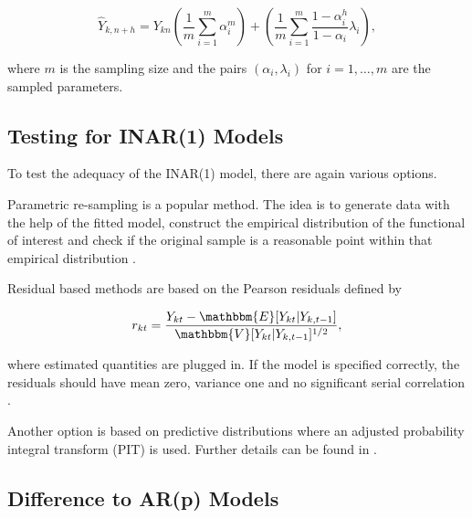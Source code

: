 \begin{equation}
\hat{Y}_{k,n+h}= Y_{kn}\left(\frac{1}{m} \sum_{i=1}^m\alpha_i^m\right) + \left(\frac{1}{m} \sum_{i=1}^m \frac{1-\alpha_i^h}{1-\alpha_i}\lambda_i\right),
\label{eq:Forecasting Bayesian}
\end{equation}

where $m$ is the sampling size and the pairs $(\alpha_i,\lambda_i)$ for $i=1,\ldots,m$ are the sampled parameters. 

\subsection{Testing for INAR(1) Models}
\label{sec:Testing for INAR(1) Models}

To test the adequacy of the INAR(1) model, there are again various options. 

Parametric re-sampling is a popular method. The idea is to generate data with the help of the fitted model, construct the empirical distribution of the functional of interest and check if the original sample is a reasonable point within that empirical distribution \cite{Silva:2005}. 

Residual based methods are based on the Pearson residuals defined by 

\begin{equation}
r_{kt} = \frac{Y_{kt}-\mathbbm{E}[Y_{kt}|Y_{k,t-1}]}{\mathbbm{V}[Y_{kt}|Y_{k,t-1}]^{1/2}},
\label{eq:Pearson residuals}
\end{equation}

where estimated quantities are plugged in. If the model is specified correctly, the residuals should have mean zero, variance one and no significant serial correlation \cite{Silva:2005}. 

Another option is based on predictive distributions where an adjusted probability integral transform (PIT) is used. Further details can be found in \cite{Silva:2005}. 

\subsection{Difference to AR(p) Models}
\label{sec: Difference to AR models}


